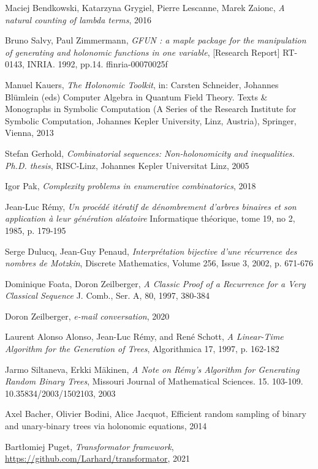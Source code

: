 \documentclass[final]{article}
\theoremstyle{definition}
\theoremstyle{remark}
\begin{document}
\begin{thebibliography}{9}
    Maciej Bendkowski, Katarzyna Grygiel, Pierre Lescanne, Marek Zaionc,
    \textit{A natural counting of lambda terms},
    2016

    Bruno Salvy, Paul Zimmermann,
    \textit{GFUN : a maple package for the manipulation of generating and holonomic functions in one variable},
    [Research Report] RT-0143, INRIA. 1992, pp.14. ffinria-00070025f

    Manuel Kauers,
    \textit{The Holonomic Toolkit},
    in: Carsten Schneider, Johannes Blümlein (eds) Computer Algebra in Quantum Field Theory. Texts \& Monographs in Symbolic Computation (A Series of the Research Institute for Symbolic Computation, Johannes Kepler University, Linz, Austria),
    Springer, Vienna,
    2013

    Stefan Gerhold,
    \textit{Combinatorial sequences: Non-holonomicity and inequalities. Ph.D. thesis},
    RISC-Linz, Johannes Kepler Universitat Linz,
    2005

    Igor Pak,
    \textit{Complexity problems in enumerative combinatorics},
    2018

    Jean-Luc Rémy,
    \textit{Un procédé itératif de dénombrement d’arbres binaires et son application à leur génération aléatoire}
    Informatique théorique, tome 19, no 2, 
    1985,
    p. 179-195

    Serge Dulucq, Jean-Guy Penaud,
    \textit{Interprétation bijective d'une récurrence des nombres de Motzkin},
    Discrete Mathematics,
    Volume 256, Issue 3,
    2002,
    p. 671-676

    Dominique Foata, Doron Zeilberger,
    \textit{A Classic Proof of a Recurrence for a Very Classical Sequence}
    J. Comb., Ser. A, 80,
    1997, 380-384

    Doron Zeilberger,
    \textit{e-mail conversation},
    2020


    Laurent Alonso Alonso, Jean-Luc Rémy, and René Schott,
    \textit{A Linear-Time Algorithm for the Generation of Trees},
    Algorithmica 17,
    1997,
    p. 162-182

    Jarmo Siltaneva, Erkki Mäkinen,
    \textit{A Note on Rémy's Algorithm for Generating Random Binary Trees},
    Missouri Journal of Mathematical Sciences. 15. 103-109. 10.35834/2003/1502103,
    2003 

    Axel Bacher, Olivier Bodini, Alice Jacquot,
    Efficient random sampling of binary and unary-binary trees via holonomic equations,
    2014


    Bartłomiej Puget,
    \textit{Transformator framework},
    \url{https://github.com/Larhard/transformator},
    2021

\end{thebibliography}
\end{document}
